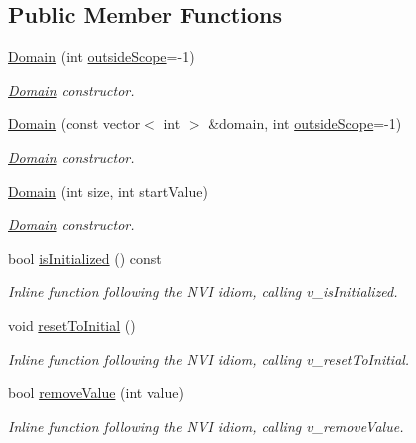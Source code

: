 \subsection*{Public Member Functions}
\begin{DoxyCompactItemize}
\item 
\hyperlink{classghost_1_1Domain_a48bfae90d7dbb6d8e1a3afdd8e471e4f}{Domain} (int \hyperlink{classghost_1_1Domain_a057618072bec63bce85321dd413eb957}{outside\-Scope}=-\/1)
\begin{DoxyCompactList}\small\item\em \hyperlink{classghost_1_1Domain}{Domain} constructor. \end{DoxyCompactList}\item 
\hyperlink{classghost_1_1Domain_a5277f6bd2940a87b4784834e93cb53c9}{Domain} (const vector$<$ int $>$ \&domain, int \hyperlink{classghost_1_1Domain_a057618072bec63bce85321dd413eb957}{outside\-Scope}=-\/1)
\begin{DoxyCompactList}\small\item\em \hyperlink{classghost_1_1Domain}{Domain} constructor. \end{DoxyCompactList}\item 
\hyperlink{classghost_1_1Domain_a6a9f7b0aec78acb0b0f4edefaea7a6e9}{Domain} (int size, int start\-Value)
\begin{DoxyCompactList}\small\item\em \hyperlink{classghost_1_1Domain}{Domain} constructor. \end{DoxyCompactList}\item 
bool \hyperlink{classghost_1_1Domain_a1ead2b1ccee560dac9ddb68c15362511}{is\-Initialized} () const 
\begin{DoxyCompactList}\small\item\em Inline function following the N\-V\-I idiom, calling v\-\_\-is\-Initialized. \end{DoxyCompactList}\item 
void \hyperlink{classghost_1_1Domain_a434b4c4fd270ee9be6853b330af9bad4}{reset\-To\-Initial} ()
\begin{DoxyCompactList}\small\item\em Inline function following the N\-V\-I idiom, calling v\-\_\-reset\-To\-Initial. \end{DoxyCompactList}\item 
bool \hyperlink{classghost_1_1Domain_a78a9ea39322c0a5984d62331c3c18756}{remove\-Value} (int value)
\begin{DoxyCompactList}\small\item\em Inline function following the N\-V\-I idiom, calling v\-\_\-remove\-Value. \end{DoxyCompactList}\item 

\end{DoxyCompactItemize}
